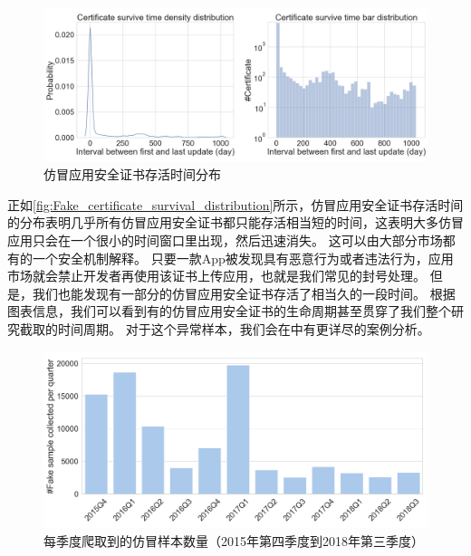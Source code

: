 \begin{figure}[htbp]
	\centering
	\includegraphics[width=\textwidth]{./Figures/edwin-Fake_certificate_survival_distribution2.png}
	\caption{仿冒应用安全证书存活时间分布}
	\label{fig:Fake_certificate_survival_distribution}
\end{figure}

正如\autoref{fig:Fake_certificate_survival_distribution}所示，仿冒应用安全证书存活时间的分布表明几乎所有仿冒应用安全证书都只能存活相当短的时间，这表明大多仿冒应用只会在一个很小的时间窗口里出现，然后迅速消失。
这可以由大部分市场都有的一个安全机制解释。
只要一款App被发现具有恶意行为或者违法行为，应用市场就会禁止开发者再使用该证书上传应用，也就是我们常见的封号处理。
但是，我们也能发现有一部分的仿冒应用安全证书存活了相当久的一段时间。
根据图表信息，我们可以看到有的仿冒应用安全证书的生命周期甚至贯穿了我们整个研究截取的时间周期。
对于这个异常样本，我们会在中有更详尽的案例分析。

\begin{figure}[htbp]
	\centering
	\includegraphics[width=\textwidth]{./Figures/edwin-Number_of_samples_collected_per_quarter_3.png}
	\caption{每季度爬取到的仿冒样本数量（2015年第四季度到2018年第三季度）}
	\label{fig:Number_per_quarter}
\end{figure}

